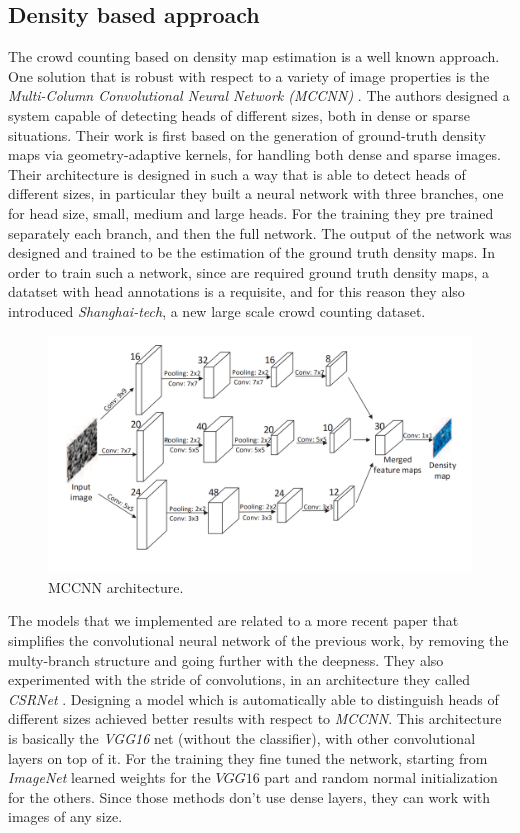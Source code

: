 \documentclass[10pt,twocolumn,letterpaper]{article}
\begin{document}
\subsection{Density based approach}
The crowd counting based on density map estimation is a well known approach. One solution that is robust with respect to a variety of image properties is the \textit{Multi-Column Convolutional Neural Network (MCCNN)} \cite{zhang2016single}. The authors designed a system capable of detecting heads of different sizes, both in dense or sparse situations. Their work is first based on the generation of ground-truth density maps via geometry-adaptive kernels, for handling both dense and sparse images. Their architecture is designed in such a way that is able to detect heads of different sizes, in particular they built a neural network with three branches, one for head size, small, medium and large heads. For the training they pre trained separately each branch, and then the full network. The output of the network was designed and trained to be the estimation of the ground truth density maps. In order to train such a network, since are required ground truth density maps, a datatset with head annotations is a requisite, and for this reason they also introduced \textit{Shanghai-tech}, a new large scale crowd counting dataset. 

\begin{figure}[h!]
	\includegraphics[width=\linewidth]{pics/MCCNN.png}
	\caption{MCCNN architecture.}
	\label{fig:MCCNN}
\end{figure}


 The models that we implemented are related to a more recent paper that simplifies the convolutional neural network of the previous work, by removing the multy-branch structure and going further with the deepness. They also experimented with the stride of convolutions, in an architecture they called \textit{CSRNet} \cite{li2018csrnet}. Designing a model which is automatically able to distinguish heads of different sizes achieved better results with respect to \textit{MCCNN}. This architecture is basically the \textit{VGG16} net (without the classifier), with other convolutional layers on top of it. For the training they fine tuned the network, starting from \textit{ImageNet} learned weights for the $VGG16$ part and random normal initialization for the others. Since those methods \cite{zhang2016single,li2018csrnet} don't use dense layers, they can work with images of any size.
\end{document}
